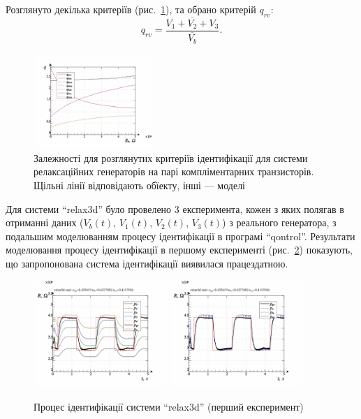 \documentclass[a4paper,13pt]{atuaref}
\begin{document}
Розглянуто декілька критеріїв (рис.~\ref{atu:f:relax3d_q}), та обрано критерій $q_{rv}$:
%
\begin{equation}
  q_{rv} = \frac{\overline{V_1+V_2+V_3}}{\overline{V_b}}.
  \label{atu:eq:q_rv_relax}
\end{equation}

\begin{figure}[htb!]
  \centerline{\includegraphics[width=0.40\textwidth]{p7/p/relax3d_read_q-p_q1.png} }
  \caption{Залежності для розглянутих критеріїв ідентифікації для системи
  релаксаційних генераторів на парі компліментарних транзисторів.
  Щільні лінії відповідають обїекту, інші --- моделі}
  \label{atu:f:relax3d_q}
\end{figure}

Для системи ``relax3d'' було провелено 3 експеримента, кожен з яких полягав в отриманні даних
($ V_b (t) $, $ V_1 (t) $, $ V_2 (t) $, $ V_3(t) $) з реального генератора, з подальшим моделюванням процесу ідентифікації в
програмі ``qontrol''.
Результати моделювання процесу ідентифікації в першому експерименті
(рис.~\ref{atu:f:relax3d_id_1}) показують, що запропонована система
ідентифікації виявилася працездатною.

\begin{figure}[htb!]
  \centerline{
    \includegraphics[width=0.45\textwidth]{p7/p/relax3d_read_id2-p_p_00.png}
    \hfill
    \includegraphics[width=0.45\textwidth]{p7/p/relax3d_read_id2-p_pp_00.png}
  }
  \caption{Процес ідентифікації системи ``relax3d'' (перший експеримент)}
  \label{atu:f:relax3d_id_1}
\end{figure}
\end{document}
